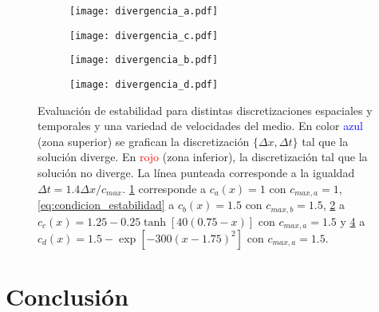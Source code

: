 \documentclass[aps,prb,twocolumn,superscriptaddress,floatfix,longbibliography,10pt]{revtex4-2}
\newcounter{para}
\begin{document}
\onecolumngrid

\begin{figure}
  \centering
  \begin{subfigure}[b]{0.45\textwidth}
      \centering
      \texttt{[image: divergencia\_a.pdf]}
      \caption{\label{fig:divergencia_a}}
  \end{subfigure}
  \hfill
  \begin{subfigure}[b]{0.45\textwidth}
      \centering
      \texttt{[image: divergencia\_c.pdf]}
      \caption{\label{fig:divergencia_b}}
  \end{subfigure}
  \hfill
  \begin{subfigure}[b]{0.45\textwidth}
      \centering
      \texttt{[image: divergencia\_b.pdf]}
      \caption{\label{fig:divergencia_c}}
  \end{subfigure}
  \hfill
  \begin{subfigure}[b]{0.45\textwidth}
      \centering
      \texttt{[image: divergencia\_d.pdf]}
      \caption{\label{fig:divergencia_d}}
  \end{subfigure}
     \caption{Evaluación de estabilidad para distintas discretizaciones espaciales y temporales y una variedad de velocidades del medio. En color \textcolor{blue}{azul} (zona superior) se grafican la discretización $\{\Delta x, \Delta t \}$ tal que la solución diverge. En \textcolor{red}{rojo} (zona inferior), la discretización tal que la solución no diverge. La línea punteada corresponde a la igualdad $\Delta t = 1.4 \Delta x / c_{max}$. \ref{fig:divergencia_a} corresponde a $c_a(x) = 1$ con $c_{max,a} = 1$, \ref{eq:condicion_estabilidad} a $c_b(x) = 1.5$ con $c_{max,b} = 1.5$, \ref{fig:divergencia_b} a $c_c(x) = 1.25 -0.25 \tanh{[40(0.75-x)]}$ con $c_{max,a} = 1.5$ y \ref{fig:divergencia_d} a $c_d(x) = 1.5 - \exp{[-300(x-1.75)^2]}$ con $c_{max,a} = 1.5$.}
     \label{fig:divergencias}
\end{figure}

\twocolumngrid


\section{Conclusión}




\end{document}

